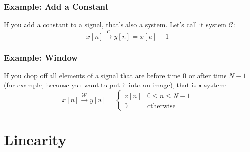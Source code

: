 \documentclass{beamer}
\begin{document}
\begin{frame}
  \frametitle{Example: Add a Constant}

  If you add a constant to a signal, that's also a system.  Let's call
  it system ${\mathcal C}$:
  \[
  x[n]\stackrel{\mathcal C}{\longrightarrow} y[n]=x[n]+1
  \]
  
\end{frame}

\begin{frame}
  \frametitle{Example: Window}

  If you chop off all elements of a signal that are before time $0$ or
  after time $N-1$ (for example, because you want to put it into an
  image), that is a system:
  \[
  x[n]\stackrel{\mathcal W}{\longrightarrow} y[n]=\begin{cases}x[n]&0\le n\le N-1\\0&\mbox{otherwise}
  \end{cases}
  \]
  
\end{frame}



\section[Linearity]{Linearity}
\setcounter{subsection}{1}
\end{document}
